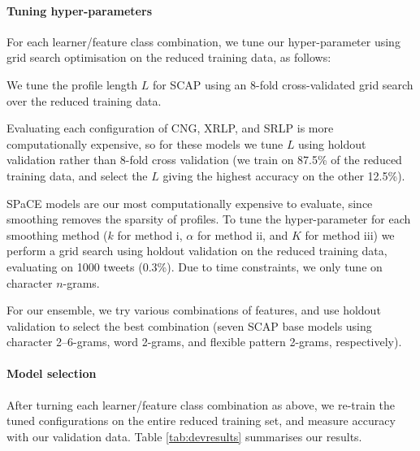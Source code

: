 \documentclass[twocolumn,10pt]{article}
\begin{document}

\paragraph{Tuning hyper-parameters}

For each learner/feature class combination, we tune our hyper-parameter
using grid search optimisation on the reduced training data, as follows:

We tune the profile length $L$ for SCAP using an 8-fold cross-validated
grid search over the reduced training data.

Evaluating each configuration of CNG, XRLP, and SRLP is more
computationally expensive, so for these models we tune $L$ using
holdout validation rather than 8-fold cross validation
(we train on 87.5\% of the reduced training data, and select the $L$
giving the highest accuracy on the other 12.5\%).

SPaCE models are our most computationally expensive to evaluate,
since smoothing removes the sparsity of profiles.
To tune the hyper-parameter for each smoothing method
($k$ for method i, $\alpha$ for method ii, and $K$ for method iii)
we perform a grid search using holdout validation on the reduced training
data, evaluating on 1000 tweets (0.3\%).
Due to time constraints, we only tune on character $n$-grams.

For our ensemble, we try various combinations of features, and use
holdout validation to select the best combination
(seven SCAP base models using character 2--6-grams, word 2-grams,
and flexible pattern 2-grams, respectively).


\paragraph{Model selection}
After turning each learner/feature class combination as above,
we re-train the tuned configurations on the entire reduced
training set, and measure accuracy with our validation data.
Table \ref{tab:devresults} summarises our results.
\end{document}
